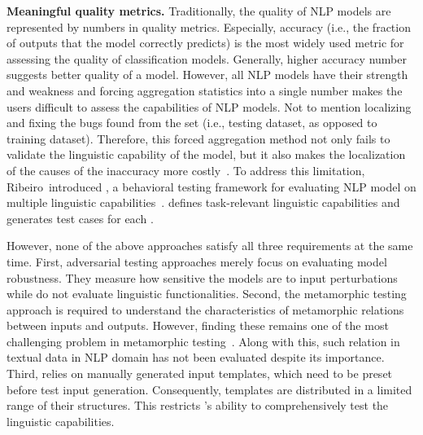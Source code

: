 \noindent \textbf{Meaningful quality metrics.}  Traditionally, the
quality of NLP models are represented by numbers in quality
metrics. Especially, accuracy (i.e., the fraction of outputs that the
model correctly predicts) is the most widely used metric for assessing
the quality of classification models.  Generally, higher accuracy
number suggests better quality of a model.  However, all NLP models
have their strength and weakness and forcing aggregation statistics
into a single number makes the users difficult to assess the
capabilities of NLP models.  Not to mention localizing and fixing the
bugs found from the \ho set (i.e., testing dataset, as opposed to
training dataset). Therefore, this forced aggregation method not only
fails to validate the linguistic capability of the model, but it also
makes the localization of the causes of the inaccuracy more
costly~\cite{wu2019errudite}.
To address this limitation,
Ribeiro~\etal introduced \Cklst, a behavioral testing framework for
evaluating NLP model on multiple linguistic
capabilities~\cite{marcoACL2020checklist}. \Cklst defines
task-relevant linguistic capabilities and generates test cases for
each \lc.

However, none of the above approaches satisfy all three requirements
at the same time. First, adversarial testing approaches merely focus
on evaluating model robustness. They measure how sensitive the models
are to input perturbations while do not evaluate linguistic
functionalities.  Second, the metamorphic testing approach is required
to understand the characteristics of metamorphic relations between
inputs and outputs. However, finding these remains one of the most
challenging problem in metamorphic
testing~\cite{segura2016metamorphictest}. Along with this, such
relation in textual data in NLP domain has not been evaluated despite
its importance.  Third, \Cklst relies on manually generated input
templates, which need to be preset before test input
generation. Consequently, \Cklst templates are distributed in a
limited range of their structures. This restricts \Cklst's ability to
comprehensively test the linguistic capabilities.

